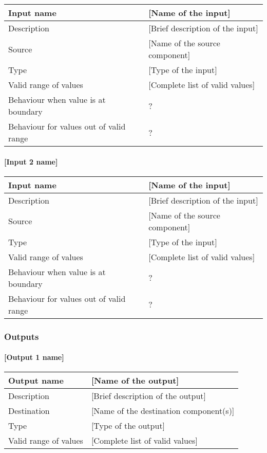 \begin{longtable}{p{}p{}}
\toprule
Input name				& [Name of the input] \\
\midrule
Description				& [Brief description of the input] \\
\midrule
Source					& [Name of the source component] \\ 
\midrule
Type						& [Type of the input] \\
\midrule
Valid range of values	& [Complete list of valid values] \\
\midrule
Behaviour when value is at boundary	& ? \\
\midrule
Behaviour for values out of valid range	& ? \\
\bottomrule
\end{longtable}


\paragraph{[Input 2 name]}

\begin{longtable}{p{}p{}}
\toprule
Input name				& [Name of the input] \\
\midrule
Description				& [Brief description of the input] \\
\midrule
Source					& [Name of the source component] \\ 
\midrule
Type						& [Type of the input] \\
\midrule
Valid range of values	& [Complete list of valid values] \\
\midrule
Behaviour when value is at boundary	& ? \\
\midrule
Behaviour for values out of valid range	& ? \\
\bottomrule
\end{longtable}


\subsubsection{Outputs}\label{s:template_outputs}

\paragraph{[Output 1 name]}

\begin{longtable}{p{}p{}}
\toprule
Output name				& [Name of the output] \\
\midrule
Description				& [Brief description of the output] \\
\midrule
Destination				& [Name of the destination component(s)] \\ 
\midrule
Type						& [Type of the output] \\
\midrule
Valid range of values	& [Complete list of valid values] \\
\bottomrule
\end{longtable}


